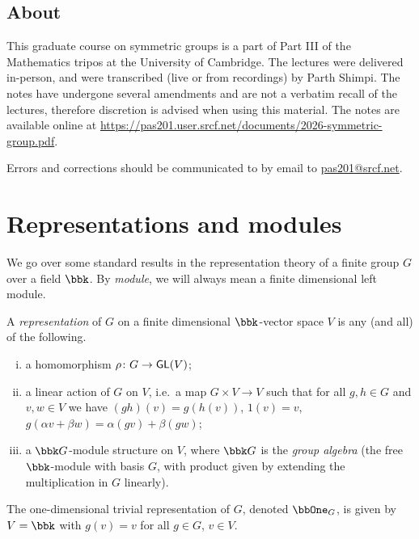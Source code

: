 \subsection{About} This graduate course on symmetric groups is a part of Part III of the
Mathematics tripos at the University of Cambridge. The lectures were delivered
in-person, and were transcribed (live or from recordings) by Parth Shimpi. The
notes have undergone several amendments and are not a verbatim recall of the
lectures, therefore discretion is advised when using this material. The notes
are available online at
\url{https://pas201.user.srcf.net/documents/2026-symmetric-group.pdf}.

Errors and corrections should be communicated to by email to
\url{pas201@srcf.net}.

\section{Representations and modules}
We go over some standard results in the representation theory of a finite group
$G$ over a field $\bbk$. By \emph{module}, we will always mean a finite
dimensional left module.

\begin{definition} 
    A \emph{representation} of $G$ on a finite dimensional $\bbk$-vector space
    $V$ is any (and all) of the following.
    \begin{enumerate}[(i)]
        \item a homomorphism $\rho\colon G\to \mathsf{GL}(V)$;
        \item a linear action of $G$ on $V$, i.e.\ a map $G\times V \to V$ such
            that for all $g,h\in G$ and $v,w\in V$ we have $(gh)(v)=g(h(v))$,
            $1(v)=v$, $g(\alpha v + \beta w)=\alpha(gv)+\beta(gw)$;
        \item a $\bbk G$-module structure on $V$, where $\bbk G$ is the
            \emph{group algebra} (the free $\bbk$-module with basis $G$, with
            product given by extending the multiplication in $G$ linearly). 
    \end{enumerate}
\end{definition}

\begin{example}
    The one-dimensional trivial representation of $G$, denoted $\bbOne_G$, is
    given by $V=\bbk$ with $g(v)=v$ for all $g\in G$, $v\in V$.
\end{example}

